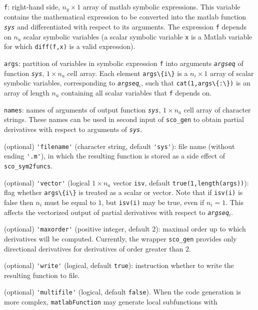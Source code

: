 \documentclass[11pt]{scrartcl}
\newcommand{\blist}[1]{\mbox{\lstinline!#1!}}
\newcommand{\mlvar}[1]{\lstinline[keywordstyle=\color{var}]!#1!}
\newcommand{\genvar}[1]{\textit{\texttt{#1}}}
\begin{document}
\begin{compactitem}
\item \blist{f}: right-hand side, $n_y\times1$ array of matlab
  symbolic expressions. This variable contains the mathematical
  expression to be converted into the matlab function \genvar{sys}
  and differentiated with respect to its arguments. The expression
  \blist{f} depends on $n_u$ scalar symbolic variables (a scalar
  symbolic variable \blist{x} is a Matlab variable for which
  \blist{diff(f,x)} is a valid expression).
\item \blist{args}: partition of variables in symbolic expression
  \blist{f} into arguments \genvar{argseq} of function \genvar{sys},
  $1\times n_a$ cell array. Each element \blist{args\{i\}} is a
  $n_i\times1$ array of scalar symbolic variables, corresponding to
  \genvar{argseq}$_i$, such that \blist{cat(1,args\{:\})} is an array
  of length $n_u$ containing all scalar variables that \blist{f}
  depends on.
\item \blist{names}: names of arguments of output function
  \genvar{sys}, $1\times n_a$ cell array of character strings. These
  names can be used in second input of \blist{sco_gen} to obtain
  partial derivatives with respect to arguments of \genvar{sys}.
\item (optional) \blist{'filename'} (character string, default
  \blist{'sys'}): file name (without ending \blist{'.m'}), in which
  the resulting function is stored as a side effect of
  \blist{sco_sym2funcs}.
\item (optional) \blist{'vector'} (logical $1\times n_a$ vector
  \mlvar{isv}, default \blist{true(1,length(args))}): flag whether
  \blist{args\{i\}} is treated as a scalar or vector. Note that if
  \blist{isv(i)} is false then $n_i$ must be equal to $1$, but
  \blist{isv(i)} may be true, even if $n_i=1$. This affects the
  vectorized output of partial derivatives with respect to
  \genvar{argseq}$_i$.
\item (optional) \blist{'maxorder'} (positive integer, default $2$):
  maximal order up to which derivatives will be computed. Currently,
  the wrapper \blist{sco_gen} provides only directional derivatives
  for derivatives of order greater than $2$.
\item (optional) \blist{'write'} (logical, default \blist{true}):
  instruction whether to write the resulting function to file.
\item (optional) \blist{'multifile'} (logical, default
  \blist{false}). When the code generation is more complex,
  \blist{matlabFunction} may generate local subfunctions with

\end{compactitem}
\end{document}
